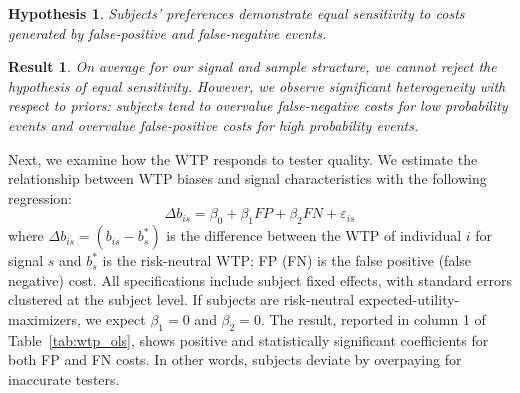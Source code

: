 \documentclass[12pt,a4paper]{article}
\newtheorem{hypothesis}{Hypothesis}
\newtheorem{result}{Result}
\begin{document}

%






\begin{hypothesis}\label{hyp:eqSen} 
Subjects' preferences demonstrate equal sensitivity to costs generated by false-positive and false-negative events. 
\end{hypothesis}

\begin{result} 
On average for our signal and sample structure, we cannot reject the hypothesis of equal sensitivity. However, we observe significant heterogeneity with respect to priors: subjects tend to overvalue false-negative costs for low probability events and overvalue false-positive costs for high probability events. 
\end{result}


Next, we examine how the WTP responds to tester quality. We estimate the relationship between WTP biases and signal characteristics with the following regression:
\[\Delta b_{is} = \beta_0 + \beta_1 FP + \beta_2 FN + \varepsilon_{is}\]
where $\Delta b_{is} = (b_{is} - b^*_s)$ is the difference between the WTP of individual $i$ for signal $s$ and $b^*_s$ is the risk-neutral WTP; FP (FN) is the false positive (false negative) cost. All specifications include subject fixed effects, with standard errors clustered at the subject level. If subjects are risk-neutral expected-utility-maximizers, we expect $\beta_1=0$ and $\beta_2=0$. The result, reported in column 1 of Table~\ref{tab:wtp_ols}, shows positive and statistically significant coefficients for both FP and FN costs. In other words, subjects deviate by overpaying for inaccurate testers. 


\end{document}
